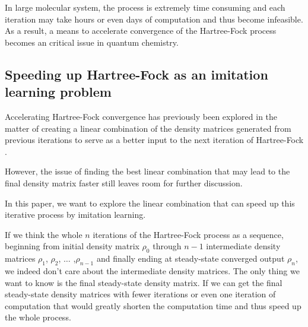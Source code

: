 \documentclass[twoside]{article}
\begin{document}
In large molecular system, the process is extremely time consuming and each iteration may take hours or even days of computation and thus become infeasible. 
As a result, a means to accelerate convergence of the Hartree-Fock process becomes an critical issue in quantum chemistry.



\subsection{Speeding up Hartree-Fock as an imitation learning problem}


Accelerating Hartree-Fock convergence has previously been explored in the matter of creating a linear combination of the density matrices generated from previous iterations to serve as a better input to the next iteration of Hartree-Fock \cite{Pulay1980}. 


However, the issue of finding the best linear combination that may lead to the final density matrix faster still leaves room for further discussion.

In this paper,
we want to explore the linear combination that can speed up this iterative process by imitation learning. 






If we think the whole $n$ iterations of the Hartree-Fock process as a sequence, beginning from initial density matrix $\rho_0$ through $n-1$ intermediate density matrices $\rho_1$,  $\rho_2$,  $\ldots$ ,$\rho_{n-1}$ and finally ending at steady-state converged output $\rho_{n}$, we indeed don't care about the intermediate density matrices. The only thing we want to know is the final steady-state density matrix. If we can get the final steady-state density matrices with fewer iterations or even one iteration of computation that would greatly shorten the computation time and thus speed up the whole process. 
\end{document}
